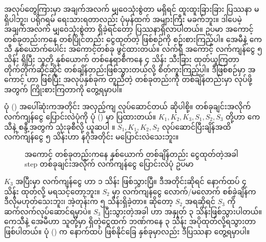  အလုပ်တွေကြားမှာ အချက်အလက် မျှဝေသုံးစွဲတာ မရှိရင် ထူးထူးခြားခြား ပြဿနာ မရှိပါဘူး၊ ပရိုဂရမ် ရေးသားရတာလည်း ပုံမှန်ထက် အများကြီး မခက်ဘူး။ ဒါပေမဲ့ အချက်အလက် မျှဝေသုံးစွဲတာ ရှိခဲ့ရင်တော့ ပြဿနာရှိလာပါတယ်။ ဥပမာ အကောင့်တစ်ခုတည်းကနေ တစ်ပြိုင်တည်း ငွေထုတ်တဲ့ ဖြစ်စဉ်ကို စဉ်းစားကြည့်ပါ။ အေမီနဲ့ ကေသီ နှစ်ယောက်ပေါင်း အကောင့်တစ်ခု ဖွင့်ထားတယ်။ လက်ရှိ အကောင့် လက်ကျန်ငွေ  ၅ သိန်း ရှိပြီး သူတို့ နှစ်ယောက် တစ်နေရာစီကနေ ၄ သိန်း သီးခြား ထုတ်ယူကြတာ တိုက်တိုက်ဆိုင်ဆိုင် တစ်ချိန်တည်းဖြစ်သွားတယ်လို့ စိတ်ကူးကြည့်ပါ။ ဒီဖြစ်စဉ်မှာ အကောင့်  ဟာ  ဖြစ်ပြီး အလုပ်နှစ်ခုက တူညီတဲ့  တစ်ခုတည်းကို တစ်ချိန်တည်းမှာ  လုပ်ဖို့အတွက် ကြိုးစားကြတာကို တွေ့ရမှာပါ။




ပုံ (\fRefNo{\ref{fig:accwithdrawconcur1}}) အပေါ်ဆုံးကအတိုင်း အလှည့်ကျ လုပ်ဆောင်တယ် ဆိုပါစို့။  တစ်ခုချင်းအလိုက် လက်ကျန်ငွေ  ပြောင်းလဲပုံကို ပုံ (\fRefNo{\ref{fig:accwithdrawconcur2}}) မှာ ပြထားတယ်။ $K_1, K_2, K_3, S_1, S_2, S_3$ တို့ဟာ ကေသီနဲ့ စန္ဒီ့အတွက်  သုံးခုစီလို့ ယူဆပါ ။ $S_1, K_1, K_2, S_2$ လုပ်ဆောင်ပြီးချိန်အထိ လက်ကျန်ငွေ ၅ သိန်းဟာ နဂိုအတိုင်း မပြောင်းလဲသေးဘူး။


%
\begin{figure}[H]
    \caption{အကောင့် တစ်ခုတည်းကနေ နှစ်ယောက် တစ်ချိန်တည်း ငွေထုတ်တဲ့အခါ step တစ်ခုချင်းအလိုက် လက်ကျန်ငွေ ပြောင်းလဲပုံ ဥပမာ}
    \label{fig:accwithdrawconcur2}
\end{figure}
%
$K_3$ အပြီးမှာ လက်ကျန်ငွေ  ဟာ ၁ သိန်း ဖြစ်သွားပြီ။ ဒီအတိုင်းဆိုရင် နောက်\allowbreak ထပ် ၄ သိန်း ထုတ်လို့ မရသင့်တော့ဘူး။ $S_2$ မှာ လက်ကျန်ငွေ လောက်/မလောက် စစ်ခဲ့ချိန်က ဒီလိုမဟုတ်သေးဘူး၊ အဲ့တုန်းက ၅ သိန်းရှိခဲ့တာ။ ဆိုတော့ $S_2$ အရဆိုရင် $S_3$ ကို ဆက်လက်လုပ်ဆောင်ရမှာပဲ။ $S_3$ ပြီးသွားတဲ့အခါ  ဟာ အနှုတ် ၃ သိန်းဖြစ်သွားပါတယ်။ ကေသီနဲ့ အေမီဟာ သူတို့မှာ ရှိတဲ့ငွေထက် ဘဏ်ကနေ ၃ သိန်း အပိုထုတ်လို့ရသွားတာ ဖြစ်ပါတယ်။  ပုံ (\fRefNo{\ref{fig:accwithdrawconcur1}}) က နောက်ထပ် ဖြစ်နိုင်ခြေ နှစ်ခုမှာလည်း ဒီပြဿနာ တွေ့ရမှာပါ။

